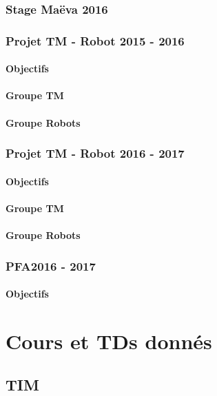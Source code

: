 \documentclass[french,a4paper,openany,12pt]{book}
\begin{document}
\subsubsection{Stage Maëva 2016}

\subsubsection{Projet TM - Robot 2015 - 2016}
\paragraph{Objectifs}
\paragraph{Groupe TM}
\paragraph{Groupe Robots}

\subsubsection{Projet TM - Robot 2016 - 2017}
\paragraph{Objectifs}
\paragraph{Groupe TM}
\paragraph{Groupe Robots}

\subsubsection{PFA2016 - 2017}
\paragraph{Objectifs}

\section{Cours et TDs donnés}
\subsection{TIM}
\end{document}
